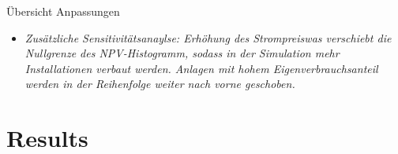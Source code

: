\documentclass[10pt, aspectratio=169]{beamer}
\begin{document}
\begin{frame}{Übersicht Anpassungen}
\begin{enumerate}
\begin{itemize}
        \item \textit{
        Zusätzliche Sensitivitätsanaylse: Erhöhung des Strompreiswas verschiebt die Nullgrenze des NPV-Histogramm, sodass in der Simulation mehr Installationen verbaut werden. Anlagen mit hohem Eigenverbrauchsanteil werden in der Reihenfolge weiter nach vorne geschoben. 
        }
    \end{itemize}
\end{enumerate}
\end{frame}

\section{Results}

\end{document}
